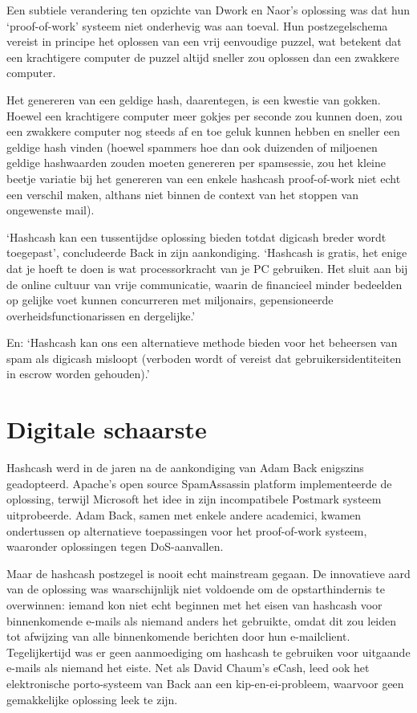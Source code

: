 \documentclass[smalldemyvopaper,11pt,twoside,onecolumn,openright,extrafontsizes,hidelinks]{memoir}
\begin{document}
Een subtiele verandering ten opzichte van Dwork en Naor's oplossing was
dat hun `proof-of-work' systeem niet onderhevig was aan toeval. Hun
postzegelschema vereist in principe het oplossen van een vrij eenvoudige
puzzel, wat betekent dat een krachtigere computer de puzzel altijd
sneller zou oplossen dan een zwakkere computer.

Het genereren van een geldige hash, daarentegen, is een kwestie van
gokken. Hoewel een krachtigere computer meer gokjes per seconde zou
kunnen doen, zou een zwakkere computer nog steeds af en toe geluk kunnen
hebben en sneller een geldige hash vinden (hoewel spammers hoe dan ook
duizenden of miljoenen geldige hashwaarden zouden moeten genereren per
spamsessie, zou het kleine beetje variatie bij het genereren van een
enkele hashcash proof-of-work niet echt een verschil maken, althans niet
binnen de context van het stoppen van ongewenste mail).

`Hashcash kan een tussentijdse oplossing bieden totdat digicash breder
wordt toegepast', concludeerde Back in zijn aankondiging. `Hashcash is
gratis, het enige dat je hoeft te doen is wat processorkracht van je PC
gebruiken. Het sluit aan bij de online cultuur van vrije communicatie,
waarin de financieel minder bedeelden op gelijke voet kunnen concurreren
met miljonairs, gepensioneerde overheidsfunctionarissen en dergelijke.'

En: `Hashcash kan ons een alternatieve methode bieden voor het beheersen
van spam als digicash misloopt (verboden wordt of vereist dat
gebruikersidentiteiten in escrow worden gehouden).'

\section{Digitale schaarste}\label{digitale-schaarste}

Hashcash werd in de jaren na de aankondiging van Adam Back enigszins
geadopteerd. Apache's open source SpamAssassin platform implementeerde
de oplossing, terwijl Microsoft het idee in zijn incompatibele Postmark
systeem uitprobeerde. Adam Back, samen met enkele andere academici,
kwamen ondertussen op alternatieve toepassingen voor het proof-of-work
systeem, waaronder oplossingen tegen DoS-aanvallen.

Maar de hashcash postzegel is nooit echt mainstream gegaan. De
innovatieve aard van de oplossing was waarschijnlijk niet voldoende om
de opstarthindernis te overwinnen: iemand kon niet echt beginnen met het
eisen van hashcash voor binnenkomende e-mails als niemand anders het
gebruikte, omdat dit zou leiden tot afwijzing van alle binnenkomende
berichten door hun e-mailclient. Tegelijkertijd was er geen aanmoediging
om hashcash te gebruiken voor uitgaande e-mails als niemand het eiste.
Net als David Chaum's eCash, leed ook het elektronische porto-systeem
van Back aan een kip-en-ei-probleem, waarvoor geen gemakkelijke
oplossing leek te zijn.
\end{document}
